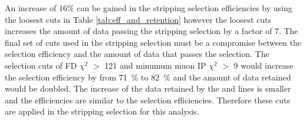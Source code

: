 An increase of $16\%$ can be gained in the stripping selection efficiencies by using the loosest cuts in Table \ref{tab:eff_and_retention} however the loosest cuts increases the amount of data passing the \bmumu stripping selection by a factor of 7. The final set of cuts used in the stripping selection must be a compromise between the selection efficiency and the amount of data that passes the selection. The selection cuts of \bs FD $\chi^{2}$ $>$ 121 and minumum muon IP $\chi^{2}$ $>$ 9 would increase the \bmumu selection efficiency by from 71~$\%$ to 82~$\%$ and the amount of data retained would be doubled. The increase of the data retained by the \bhh and \bujpsik lines is smaller and the efficiencies are similar to the \bmumu selection efficiencies. Therefore these cuts are applied in the stripping selection for this analysis. %

